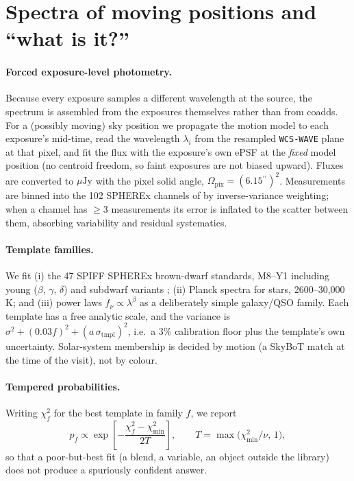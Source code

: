 \documentclass[10pt,twocolumn]{article}
\newcommand{\asec}{\ensuremath{^{\prime\prime}}}
\newcommand{\uJy}{\ensuremath{\mu\mathrm{Jy}}}
\begin{document}
\section{Spectra of moving positions and ``what is it?''}
\label{sec:spectra}

\paragraph{Forced exposure-level photometry.} Because every exposure samples a different wavelength at
the source, the spectrum is assembled from the exposures themselves rather than from coadds. For a
(possibly moving) sky position we propagate the motion model to each exposure's mid-time, read the
wavelength $\lambda_i$ from the resampled \texttt{WCS-WAVE} plane at that pixel, and fit the flux with the
exposure's own ePSF at the \emph{fixed} model position (no centroid freedom, so faint exposures are not
biased upward). Fluxes are converted to \uJy{} with the pixel solid angle,
$\Omega_\mathrm{pix}=(6.15\asec)^2$. Measurements are binned into the 102 SPHEREx channels of
\citet{gagne2026} by inverse-variance weighting; when a channel has $\geq3$ measurements its error is
inflated to the scatter between them, absorbing variability and residual systematics.

\paragraph{Template families.} We fit (i) the 47 SPIFF SPHEREx brown-dwarf standards, M8--Y1 including
young ($\beta$, $\gamma$, $\delta$) and subdwarf variants \citep{gagne2026}; (ii) Planck spectra for stars,
2600--30{,}000\,K; and (iii) power laws $f_\nu\propto\lambda^\beta$ as a deliberately simple galaxy/QSO
family. Each template has a free analytic scale, and the variance is
$\sigma^2+(0.03f)^2+(a\,\sigma_\mathrm{tmpl})^2$, i.e.\ a 3\% calibration floor plus the template's own
uncertainty. Solar-system membership is decided by motion (a SkyBoT match at the time of the visit),
not by colour.

\paragraph{Tempered probabilities.} Writing $\chi^2_f$ for the best template in family $f$, we report
\begin{equation}
  p_f \propto \exp\!\left[-\frac{\chi^2_f-\chi^2_\mathrm{min}}{2T}\right],\qquad
  T=\max\!\big(\chi^2_\mathrm{min}/\nu,\,1\big),
\end{equation}
so that a poor-but-best fit (a blend, a variable, an object outside the library) does not produce a
spuriously confident answer.
\end{document}
